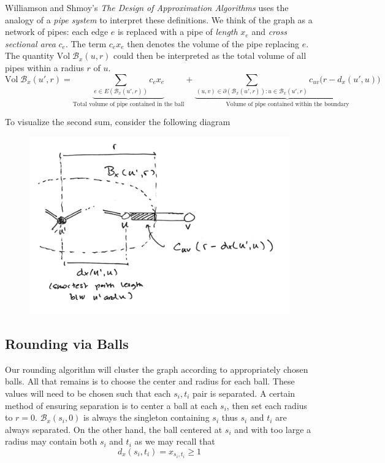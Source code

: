 Williamson and Shmoy's \emph{The Design of Approximation Algorithms} uses the analogy of a \emph{pipe system} to interpret these definitions. We think of the graph as a network of pipes: each edge $e$ is replaced with a pipe of \emph{length} $x_e$ and \emph{cross sectional area} $c_e$. The term $c_e x_e$ then denotes the volume of the pipe replacing $e$. The quantity $\text{Vol} \; \mathcal{B}_x(u, r)$ could then be interpreted as the total volume of all pipes within a radius $r$ of $u$.
\begin{equation*}
\text{Vol} \; \mathcal{B}_x(u', r)
= \underbrace{\sum_{e \in E(\mathcal{B}_x(u', r))} c_e x_e}_\text{Total volume of pipe contained in the ball}
+ \underbrace{\sum_{(u, v) \in \partial(\mathcal{B}_x(u', r)) : u \in \mathcal{B}_x(u', r)} c_{uv} \big( r - d_x(u', u) \big)}_\text{Volume of pipe contained within the boundary}
\end{equation*}

To visualize the second sum, consider the following diagram
\begin{figure}[h!]
    \centering
    \includegraphics[scale=0.17]{images/image-4.png}
\end{figure}


\subsection{Rounding via Balls}

Our rounding algorithm will cluster the graph according to appropriately chosen balls. All that remains is to choose the center and radius for each ball. These values will need to be chosen such that each $s_i, t_i$ pair is separated. A certain method of ensuring separation is to center a ball at each $s_i$, then set each radius to $r = 0$. $\mathcal{B}_x(s_i, 0)$ is always the singleton containing $s_i$ thus $s_i$ and $t_i$ are always separated. On the other hand, the ball centered at $s_i$ and with too large a radius may contain both $s_i$ and $t_i$ as we may recall that
\begin{equation*}
d_x(s_i, t_i)
= x_{s_i, t_i}
\geq 1
\end{equation*}

